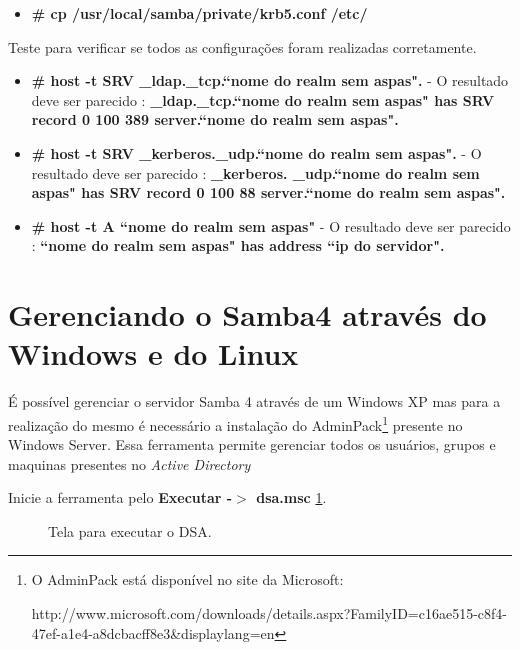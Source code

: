 \begin{itemize}
	\item \textbf{\# cp /usr/local/samba/private/krb5.conf  /etc/}
\end{itemize}

Teste para verificar se todos as configurações foram realizadas corretamente.

\begin{itemize}
	\item \textbf{\# host -t SRV \_ldap.\_tcp.``nome do realm sem aspas".} - O resultado deve ser parecido : \textbf{\_ldap.\_tcp.``nome do realm sem aspas" has SRV record 0 100 389 server.``nome do realm sem aspas".}
	\item \textbf{\# host -t SRV \_kerberos.\_udp.``nome do realm sem aspas".} - O resultado deve ser parecido : \textbf{\_kerberos. \_udp.``nome do realm sem aspas" has SRV record 0 100 88 server.``nome do realm sem aspas".}
	\item \textbf{\# host -t A ``nome do realm sem aspas"} - O resultado deve ser parecido : \textbf{``nome do realm sem aspas" has address ``ip do servidor".} 
\end{itemize}

\section{Gerenciando o Samba4 através do Windows e do Linux}

É possível gerenciar o servidor Samba 4 através de um Windows XP mas para a realização do mesmo é necessário a instalação do AdminPack\footnote[4]{O AdminPack está disponível no site da Microsoft:

http://www.microsoft.com/downloads/details.aspx?FamilyID=c16ae515-c8f4-47ef-a1e4-a8dcbacff8e3\&displaylang=en} presente no Windows Server. Essa ferramenta permite gerenciar todos os usuários, grupos e maquinas presentes no \textit{Active Directory}

Inicie a ferramenta pelo \textbf{Executar -$>$ dsa.msc} \ref{dsa}.

\begin{figure}[ht]
   	\centering
   	\caption{Tela para executar o DSA.}
    \label{dsa}
\end{figure}
 
